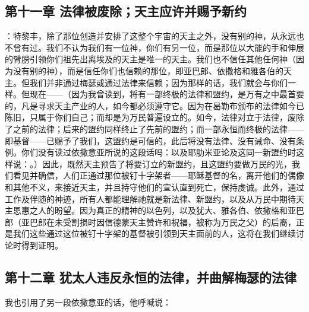 
\subsection{第十一章 法律被废除；天主应许并赐予新约}

：特黎丰，除了那位创造并安排了这整个宇宙的天主之外，没有别的神，从永远也不曾有过。我们不认为我们有一位神，你们有另一位，而是那位以大能的手和伸展的臂膀引领你们祖先出离埃及的天主是唯一的天主。我们也不信任其他任何神（因为没有别的神），而是信任你们也信赖的那位，即亚巴郎、依撒格和雅各伯的天主。但我们并非通过梅瑟或通过法律来信赖；因为那样的话，我们就会与你们一样。但现在——（因为我曾读到，将有一部终极的法律和盟约，是万有之中最首要的，凡是寻求天主产业的人，如今都必须遵守它。因为在曷勒布颁布的法律如今已陈旧，只属于你们自己；而却是为万民普遍设立的。如今，法律对立于法律，废除了之前的法律；后来的盟约同样终止了先前的盟约；而一部永恒而终极的法律——即基督——已赐予了我们，这盟约是可信的，此后将没有法律、没有诫命、没有条例。你们没有读过依撒意亚所说的这段话吗：以及耶肋米亚论及这同一新盟约时这样说：。）因此，既然天主预告了将要订立的新盟约，且这盟约要做万民的光，我们看见并确信，人们正通过那位被钉十字架者——耶稣基督的名，离开他们的偶像和其他不义，来接近天主，并且持守他们的宣认直到死亡，保持虔诚。此外，通过工作及伴随的神迹，所有人都能理解祂就是新法律、新盟约，以及从万民中期待天主恩惠之人的盼望。因为真正的精神的以色列，以及犹大、雅各伯、依撒格和亚巴郎（亚巴郎在未受割损时因信德蒙天主赞许和祝福，被称为万民之父）的后裔，正是我们这些通过这位被钉十字架的基督被引领到天主面前的人，这将在我们继续讨论时得到证明。\par


\subsection{第十二章 犹太人违反永恒的法律，并曲解梅瑟的法律}

我也引用了另一段依撒意亚的话，他呼喊说：\par

